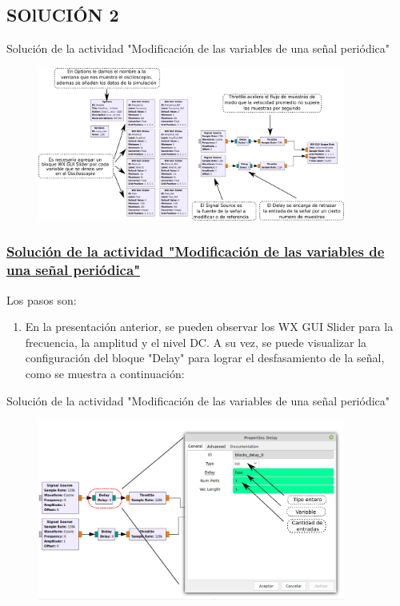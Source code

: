 \subsection{SOlUCIÓN 2}
	
	\begin{frame}{Solución de la actividad "Modificación de las variables de una señal periódica"}
	\begin{figure}[H]
		\vspace{-3mm}
		\centering 
		\includegraphics[width=0.9\textwidth]{soluciones/actividad-1-2/pdf/Mon.pdf}
		\end{figure}
	\end{frame}
	
	\begin{frame}
	\frametitle{\underline{\textbf{Solución de la actividad "Modificación de las variables de una señal periódica"}}}

	Los pasos son:
	\begin{enumerate}[1.]

	\item{En la presentación anterior, se pueden observar los WX GUI Slider para la frecuencia, la amplitud y el nivel DC. A su vez, se puede visualizar la configuración del bloque "Delay" para lograr el desfasamiento de la señal, como se muestra a continuación:}\\
	
	\end{enumerate}
	\end{frame}
	
	\begin{frame}{Solución de la actividad "Modificación de las variables de una señal periódica"}
	\begin{figure}[H]
		\vspace{-3mm}
		\centering
		\includegraphics[width=0.9\textwidth]{soluciones/actividad-1-2/pdf/Delay.pdf}
		\end{figure}
	\end{frame}

